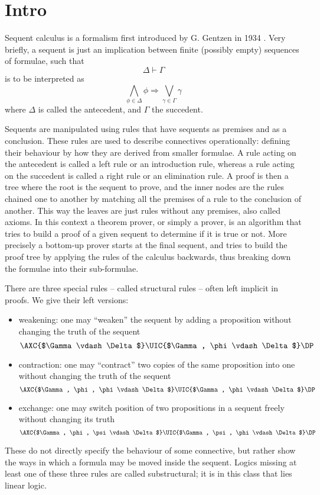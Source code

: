 \chapter{Intro}\label{chapter:intro}
Sequent calculus is a formalism first introduced by G. Gentzen in 1934 \cite{Gentzen1935I, Gentzen1935II}.
Very briefly, a sequent is just an implication between finite (possibly empty) sequences of formulae, such that
$$ \Delta \vdash \Gamma $$ 
is to be interpreted as
$$ \bigwedge_{\phi \in \Delta} \phi \Rightarrow \bigvee_{\gamma \in \Gamma} \gamma $$
where $\Delta$ is called the antecedent, and $\Gamma$ the succedent.

Sequents are manipulated using rules that have sequents as premises and as a conclusion.
These rules are used to describe connectives operationally: defining their behaviour by how they are derived from smaller formulae.
A rule acting on the antecedent is called a left rule or an introduction rule, whereas a rule acting on the succedent is called a right rule or an elimination rule.
A proof is then a tree where the root is the sequent to prove, and the inner nodes are the rules chained one to another by matching all the premises of a rule to the conclusion of another.
This way the leaves are just rules without any premises, also called axioms.
In this context a theorem prover, or simply a prover, is an algorithm that tries to build a proof of a given sequent to determine if it is true or not.
More precisely a bottom-up prover starts at the final sequent, and tries to build the proof tree by applying the rules of the calculus backwards, thus breaking down the formulae into their sub-formulae.

There are three special rules -- called structural rules -- often left implicit in proofs.
We give their left versions:
\begin{itemize}
	\item weakening: one may ``weaken'' the sequent by adding a proposition without changing the truth of the sequent
		$$
		\AXC{$\Gamma \vdash \Delta$}
		\UIC{$\Gamma, \phi \vdash \Delta$}
		\DP
		$$
	\item contraction: one may ``contract'' two copies of the same proposition into one without changing the truth of the sequent
		$$
		\AXC{$\Gamma, \phi, \phi \vdash \Delta$}
		\UIC{$\Gamma, \phi \vdash \Delta$}
		\DP
		$$
	\item exchange: one may switch position of two propositions in a sequent freely without changing its truth
		$$
		\AXC{$\Gamma, \phi, \psi \vdash \Delta$}
		\UIC{$\Gamma, \psi, \phi \vdash \Delta$}
		\DP
		$$
\end{itemize}
These do not directly specify the behaviour of some connective, but rather show the ways in which a formula may be moved inside the sequent.
Logics missing at least one of these three rules are called substructural; it is in this class that lies linear logic.


